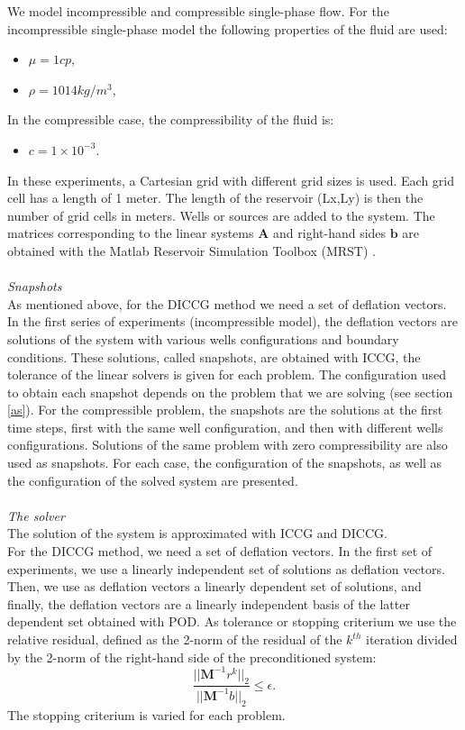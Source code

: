 \documentclass[12pt]{article}
\begin{document}
We model incompressible and compressible single-phase flow.
For the incompressible single-phase model the following properties of the fluid are used:
\begin{itemize}
 \item $\mu = 1 cp$,
 \item $\rho = 1014 kg/m^3$,
\end{itemize}
In the compressible case, the compressibility of the fluid is:
\begin{itemize}
 \item $c= 1 \times 10^{-3}$.
\end{itemize}
In these experiments, a Cartesian grid with different grid sizes is used. Each grid cell has a length of 1 meter. The length of the reservoir (Lx,Ly) is then the number of grid cells in meters. Wells or sources are added to the system. 
The matrices corresponding to the linear systems $\mathbf{A}$ and right-hand sides $\mathbf{b}$ are obtained with the Matlab Reservoir Simulation Toolbox (MRST) \cite{Lie13}.
\\ \\
\emph{Snapshots}\\
As mentioned above, for the DICCG method we need a set of deflation vectors. In the first series of
experiments (incompressible model), the deflation vectors are 
solutions of the system with various wells configurations and boundary conditions. These solutions, 
called snapshots, are obtained with ICCG, the tolerance of the linear solvers is given for each problem. 
The configuration used to obtain each snapshot depends on the problem that we are solving (see section \ref{as}). 
For the compressible problem, the snapshots are the solutions at the first time steps, first with the same well configuration, and then with different wells configurations. Solutions of the same problem with zero compressibility are also used as snapshots.
For each case,
the configuration of the snapshots, as well as the configuration of the solved system are presented.
\\ \\
\emph{The solver}\\
The solution of the system is approximated with ICCG and DICCG.\\
For the DICCG method, we need a set of deflation vectors. 
In the first set of experiments, we use a linearly independent set of solutions as deflation vectors. Then, we use as deflation vectors a linearly dependent set of solutions, and finally, the deflation vectors are a linearly independent basis of the latter dependent set obtained with POD.
As tolerance or stopping criterium we use the relative residual, defined as the 2-norm of the residual of the $k^{th}$ iteration divided by 
the 2-norm of the right-hand side of the preconditioned system: 
$$\frac{||\mathbf{M}^{-1}r^k||_2}{||\mathbf{M}^{-1}b||_2}\leq \epsilon.$$
The stopping criterium is varied for each problem. 
\\ \\
\end{document}

